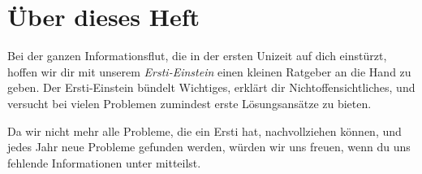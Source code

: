 \section{Über dieses Heft}

Bei der ganzen Informationsflut, die in der ersten Unizeit auf dich
einstürzt, hoffen wir dir mit unserem \emph{Ersti-Einstein} einen
kleinen Ratgeber an die Hand zu geben.  Der Ersti-Einstein bündelt
Wichtiges, erklärt dir Nichtoffensichtliches, und versucht bei vielen
Problemen zumindest erste Lösungsansätze zu bieten.

Da wir nicht mehr alle Probleme, die ein Ersti hat, nachvollziehen
können, und jedes Jahr neue Probleme gefunden werden, würden wir uns
freuen, wenn du uns fehlende Informationen unter
 mitteilst.
